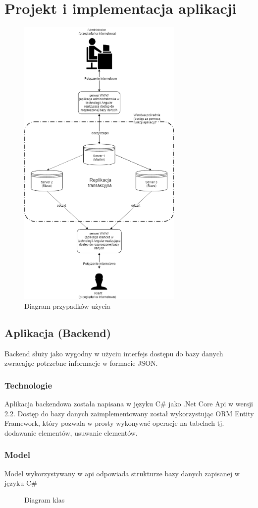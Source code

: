 \documentclass{article}
\begin{document}
\section{Projekt i implementacja aplikacji}
			\begin{figure}[hbt!]
				\includegraphics[width=8cm]{Files/Pictures/SystemStruct}
				\centering
				\caption{Diagram przypadków użycia}
			\end{figure}
			\newpage
	\subsection{Aplikacja (Backend)}
	Backend służy jako wygodny w użyciu interfejs dostępu do bazy danych zwracając potrzebne informacje w formacie JSON.
		\subsubsection{Technologie}
		Aplikacja backendowa została napisana w języku C\# jako .Net Core Api w wersji 2.2. Dostęp do bazy danych zaimplementowany został wykorzystując ORM Entity Framework, który pozwala w prosty wykonywać operacje na tabelach tj. dodawanie elementów, usuwanie elementów.
		\subsubsection{Model}
			Model wykorzystywany w api odpowiada strukturze bazy danych zapisanej w języku C\#
			\begin{figure}
				\centering
				\caption{Diagram klas}
			\end{figure}
\end{document}
